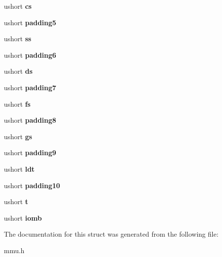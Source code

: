 \begin{DoxyCompactItemize}
ushort {\bfseries cs}
\item 
\mbox{\label{structtaskstate_ad462c3b654306417c32c78f42b5a9e42}} 
ushort {\bfseries padding5}
\item 
\mbox{\label{structtaskstate_afdd8f3985ac7ae69fc67c19d65653f12}} 
ushort {\bfseries ss}
\item 
\mbox{\label{structtaskstate_a3885094380c4d991fa86d31fdf1b9683}} 
ushort {\bfseries padding6}
\item 
\mbox{\label{structtaskstate_af5f19782df3eb439445274e08d9120f1}} 
ushort {\bfseries ds}
\item 
\mbox{\label{structtaskstate_a4c634b4b3cd489ca37979561394bf518}} 
ushort {\bfseries padding7}
\item 
\mbox{\label{structtaskstate_a4ce0e6f25b9721d7e2660c8840a0f9e3}} 
ushort {\bfseries fs}
\item 
\mbox{\label{structtaskstate_ab3077e8c9fe9b50ff7caedeeac075472}} 
ushort {\bfseries padding8}
\item 
\mbox{\label{structtaskstate_a15529ac51461a168be78130042a740e7}} 
ushort {\bfseries gs}
\item 
\mbox{\label{structtaskstate_a58a780ba0664e4ff8741adbdaccbcdd5}} 
ushort {\bfseries padding9}
\item 
\mbox{\label{structtaskstate_a960e5d4a40dcafb35f32ec047c0ca147}} 
ushort {\bfseries ldt}
\item 
\mbox{\label{structtaskstate_a6f95dd6d0ae39afaaf5ee8671220b00b}} 
ushort {\bfseries padding10}
\item 
\mbox{\label{structtaskstate_ad9d64e6139f851a3f8d2275f2748fae5}} 
ushort {\bfseries t}
\item 
\mbox{\label{structtaskstate_a5ee57b190324239a5d88f7c02039901f}} 
ushort {\bfseries iomb}
\end{DoxyCompactItemize}


The documentation for this struct was generated from the following file\+:\begin{DoxyCompactItemize}
\item 
mmu.\+h\end{DoxyCompactItemize}
